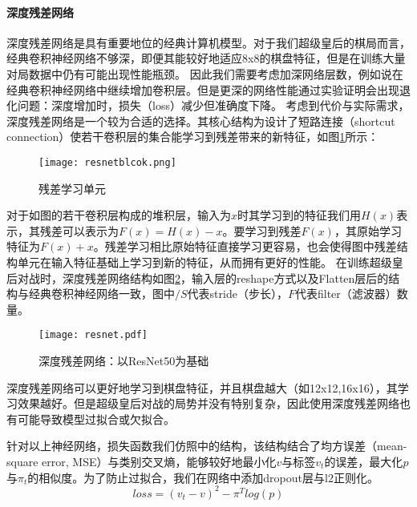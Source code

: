 \paragraph{深度残差网络}
深度残差网络是具有重要地位的经典计算机模型\cite{resnet}。对于我们超级皇后的棋局而言，经典卷积神经网络不够深，即便其能较好地适应8x8的棋盘特征，但是在训练大量对局数据中仍有可能出现性能瓶颈。
因此我们需要考虑加深网络层数，例如说在经典卷积神经网络中继续增加卷积层。但是更深的网络性能通过实验证明会出现退化问题：深度增加时，损失（loss）减少但准确度下降\cite{resnet,he2016identity}。
考虑到代价与实际需求，深度残差网络是一个较为合适的选择\cite{resnet}。其核心结构为设计了短路连接（shortcut connection）使若干卷积层的集合能学习到残差带来的新特征，如图\ref{fig:resunit}所示：
\begin{figure}[H]
    \centering
    \texttt{[image: resnetblcok.png]}
    \caption[resunit]{%
    残差学习单元\cite{resnet}%
      }
    \label{fig:resunit}
\end{figure}
对于如图的若干卷积层构成的堆积层，输入为$x$时其学习到的特征我们用$H(x)$表示，其残差可以表示为$F(x)=H(x)-x$。要学习到残差$F(x)$，其原始学习特征为$F(x)+x$。残差学习相比原始特征直接学习更容易，也会使得图中残差结构单元在输入特征基础上学习到新的特征，从而拥有更好的性能。
在训练超级皇后对战时，深度残差网络结构如图\ref{fig:res}，输入层的reshape方式以及Flatten层后的结构与经典卷积神经网络一致，图中$/S$代表stride（步长），$F$代表filter（滤波器）数量。
\begin{figure}[H]
    \centering
    \texttt{[image: resnet.pdf]}
    \caption[res]{%
    深度残差网络：以ResNet50为基础\cite{resnet}%
      }
    \label{fig:res}
\end{figure}
深度残差网络可以更好地学习到棋盘特征，并且棋盘越大（如12x12,16x16），其学习效果越好。但是超级皇后对战的局势并没有特别复杂，因此使用深度残差网络也有可能导致模型过拟合或欠拟合。

针对以上神经网络，损失函数我们仿照\cite{Silver2017}中的结构，该结构结合了均方误差（mean-square error, MSE）与类别交叉熵，能够较好地最小化$v$与标签$v_{t}$的误差，最大化$p$与$\pi_{t}$的相似度。为了防止过拟合，我们在网络中添加dropout层与l2正则化。
\begin{equation}
    loss = (v_{t}-v)^{2} - \pi^{T}log(p)
\end{equation}
